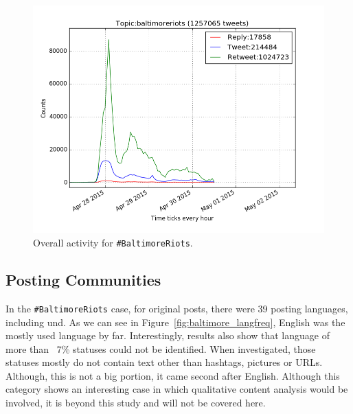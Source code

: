 \begin{figure}[htb]
\centering
\includegraphics[width=\columnwidth]{images/overallbaltimoreactivity.png}
\caption{Overall activity for {\texttt{\#BaltimoreRiots}}.}
\label{fig:overallbaltimoreactivity}
\end{figure}

\subsection{Posting Communities}\label{baltimoreposting}

In the {\texttt{\#BaltimoreRiots}} case, for original posts, there were 39 posting
languages, including und. As we can see in Figure~\ref{fig:baltimore_langfreq}, 
English was the mostly used language by far. Interestingly, results also show that
language of more than ~7\% statuses could not be
identified. When investigated, those statuses mostly do not contain
text other than hashtags, pictures or URLs. Although, this is not a
big portion, it came second after English. Although this category
shows an interesting case in which qualitative content analysis would
be involved, it is beyond this study and will not be covered here.

